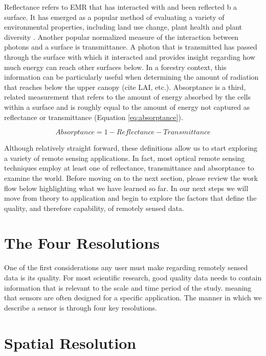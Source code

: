 \documentclass[
]{book}
\begin{document}
Reflectance refers to EMR that has interacted with and been reflected b
a surface. It has emerged as a popular method of evaluating a variety of
environmental properties, including land use change, plant health and
plant diversity \citep{asner2011}. Another popular normalized measure of the
interaction between photons and a surface is transmittance. A photon
that is transmitted has passed through the surface with which it
interacted and provides insight regarding how much energy can reach
other surfaces below. In a forestry context, this information can be
particularly useful when determining the amount of radiation that
reaches below the upper canopy (cite LAI, etc.). Absorptance is a third,
related measurement that refers to the amount of energy absorbed by
the cells within a surface and is roughly equal to the amount of
energy not captured as reflectance or transmittance (Equation
\eqref{eq:absorptance}).

\begin{equation}
Absorptance = 1 - Reflectance - Transmittance 
\label{eq:absorptance}
\end{equation}

Although relatively straight forward, these definitions allow us to
start exploring a variety of remote sensing applications. In fact, most
optical remote sensing techniques employ at least one of reflectance,
transmittance and absorptance to examine the world. Before moving on to
the next section, please review the work flow below highlighting what we
have learned so far. In our next steps we will move from theory to
application and begin to explore the factors that define the quality,
and therefore capability, of remotely sensed data.

\hypertarget{the-four-resolutions}{%
\section{The Four Resolutions}\label{the-four-resolutions}}

One of the first considerations any user must make regarding remotely
sensed data is its quality. For most scientific research, good quality
data needs to contain information that is relevant to the scale and time
period of the study. meaning that sensors are often designed for a
specific application. The manner in which we describe a sensor is
through four key resolutions.

\hypertarget{spatial-resolution}{%
\section{Spatial Resolution}\label{spatial-resolution}}
\end{document}

